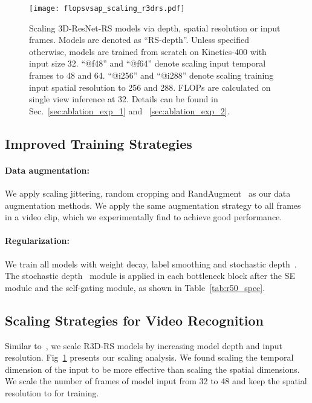 \documentclass{article} \usepackage{iclr2021_conference,times}
\begin{document}
\begin{figure}[h]
  \centering
  \texttt{[image: flopsvsap\_scaling\_r3drs.pdf]}
\caption{\small{
Scaling 3D-ResNet-RS models via depth, spatial resolution or input frames.
Models are denoted as ``RS-depth''. 
Unless specified otherwise, models are trained from scratch on Kinetics-400 with input size 32. ``@f48'' and ``@f64'' denote scaling input temporal frames to 48 and 64. 
``@i256'' and ``@i288'' denote scaling training input spatial resolution to 256 and 288. 
FLOPs are calculated on single view inference at 32.
Details can be found in Sec.~\ref{sec:ablation_exp_1} and ~\ref{sec:ablation_exp_2}.}}
\label{fig:scaling}
\vspace{-0mm}
\end{figure}


\subsection{Improved Training Strategies}
\paragraph{Data augmentation:} We apply scaling jittering, random cropping and RandAugment~\cite{Cubuk2019RandAugmentPD} as our data augmentation methods. 
We apply the same augmentation strategy to all frames in a video clip, which we experimentally find to achieve good performance.

\paragraph{Regularization:} We train all models with weight decay, label smoothing and stochastic depth~\cite{stochasticdepth}. 
The stochastic depth~\cite{stochasticdepth} module is applied in each bottleneck block after the SE module and the self-gating module, as shown in Table~\ref{tab:r50_spec}. 

\subsection{Scaling Strategies for Video Recognition}
Similar to~\cite{bello2021revisiting}, we scale R3D-RS models by increasing model depth and input resolution. 
Fig~\ref{fig:scaling} presents our scaling analysis.
We found scaling the temporal dimension of the input to be more effective than scaling the  spatial dimensions.
We scale the number of frames of model input from 32 to 48 and keep the spatial resolution to  for training. 
\end{document}
